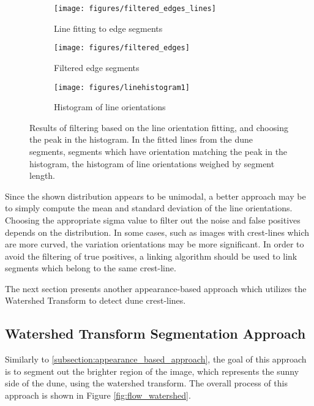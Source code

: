   \begin{figure}
  	\centering
  	\begin{subfigure}{0.48\textwidth}
  		\centering
  		\texttt{[image: figures/filtered\_edges\_lines]}
  		\caption{Line fitting to edge segments}
  		\label{fig:filtered_edges_lines}
  	\end{subfigure}
  	\begin{subfigure}{0.48\textwidth}
  		\centering
  		\texttt{[image: figures/filtered\_edges]}
  		\caption{Filtered edge segments}
  		\label{fig:filtered_edges}
  	\end{subfigure}
  	\begin{subfigure}{\textwidth}
  		\centering
  		\texttt{[image: figures/linehistogram1]}
  		\caption{Histogram of line orientations}
  		\label{fig:linehistogram}
  	\end{subfigure}
  	\caption{Results of filtering based on the line orientation fitting, and choosing the peak in the histogram. In   the fitted lines from the dune segments,  segments which have orientation matching the peak in the histogram,   the histogram of line orientations weighed by segment length. }
  	\label{fig:dune_segment_linking_line_fitting}
  \end{figure}
  
Since the shown distribution appears to be unimodal, a better approach may be to simply compute the mean and standard deviation of the line orientations. Choosing the appropriate sigma value to filter out the noise and false positives depends on the distribution. In some cases, such as images with crest-lines which are more curved, the variation orientations may be more significant. In order to avoid the filtering of true positives, a linking algorithm should be used to link segments which belong to the same crest-line.

The next section presents another appearance-based approach which utilizes the Watershed Transform to detect dune crest-lines.

\subsection{Watershed Transform Segmentation Approach} \label{subsec:watershed_transform_segmentation_approach}

Similarly to \ref{subsection:appearance_based_approach}, the goal of this approach is to segment out the brighter region of the image, which represents the sunny side of the dune, using the watershed transform. The overall process of this approach is shown in Figure \ref{fig:flow_watershed}.

